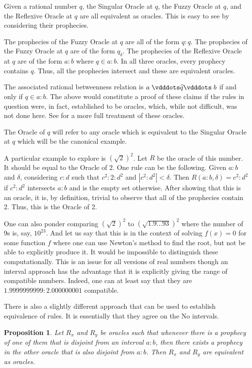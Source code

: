 \documentclass[12pt]{article}
\newtheorem{proposition}{Proposition}[section]
\begin{document}
 Given a rational number $q$, the Singular Oracle at $q$, the Fuzzy Oracle at $q$, and the Reflexive Oracle at $q$ are all equivalent as oracles. This is easy to see by considering their prophecies. 
 
 The prophecies of the Fuzzy Oracle at $q$ are all of the form $q:q$. The prophecies of the Fuzzy Oracle at $q$ are of the form $q_\delta$. The prophecies of the Reflexive Oracle at $q$ are of the form $a:b$ where $q \in a:b$. In all three oracles, every prophecy contains $q$. Thus, all the prophecies intersect and these are equivalent oracles. 

The associated rational betweenness relation is $a \xora[q] b$ if and only if $q \in a:b$. The above would constitute a proof of these claims if the rules in question were, in fact, established to be oracles, which, while not difficult, was not done here. See \cite{taylor23main} for a more full treatment of these oracles. 

The Oracle of $q$ will refer to any oracle which is equivalent to the Singular Oracle at $q$ which will be the canonical example. 

A particular example to explore is $(\sqrt{2})^2$. Let $R$ be the oracle of this number. It should be equal to the Oracle of 2. One rule can be the following. Given $a:b$ and $\delta$, considering $c:d$ such that $c^2:2:d^2$ and $|c^2:d^2|< \delta$. Then $R(a:b, \delta) = c^2:d^2$ if $c^2:d^2$ intersects $a:b$ and is the empty set otherwise. After showing that this is an oracle, it is, by definition, trivial to observe that all of the prophecies contain 2. Thus, this is the Oracle of 2. 

One can also ponder comparing $(\sqrt{2})^2$ to $(\sqrt{1.9\ldots93})^2$ where the number of 9s is, say, $10^{23}$. And let us say that this is in the context of solving $f(x) = 0$ for some function $f$ where one can use Newton's method to find the root, but not be able to explicitly produce it. It would be impossible to distinguish these computationally. This is an issue for all versions of real numbers though an interval approach has the advantage that it is explicitly giving the range of compatible numbers. Indeed, one can at least say that they are $1.9999999999:2.000000001$ compatible. 

There is also a slightly different approach that can be used to establish equivalence of rules. It is essentially that they agree on the No intervals. 

\begin{proposition}
    Let $R_x$ and $R_y$ be oracles such that whenever there is a prophecy of one of them that is disjoint from an interval $a:b$, then there exists a prophecy in the other oracle that is also disjoint from $a:b$. Then $R_x$ and $R_y$ are equivalent as oracles. 
\end{proposition}
\end{document}
